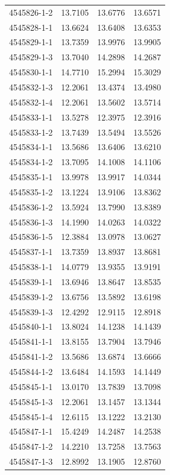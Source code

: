 \begin{longtable}{lrrr}
4545826-1-2 & 13.7105 & 13.6776 & 13.6571 \\
4545828-1-1 & 13.6624 & 13.6408 & 13.6353 \\
4545829-1-1 & 13.7359 & 13.9976 & 13.9905 \\
4545829-1-3 & 13.7040 & 14.2898 & 14.2687 \\
4545830-1-1 & 14.7710 & 15.2994 & 15.3029 \\
4545832-1-3 & 12.2061 & 13.4374 & 13.4980 \\
4545832-1-4 & 12.2061 & 13.5602 & 13.5714 \\
4545833-1-1 & 13.5278 & 12.3975 & 12.3916 \\
4545833-1-2 & 13.7439 & 13.5494 & 13.5526 \\
4545834-1-1 & 13.5686 & 13.6406 & 13.6210 \\
4545834-1-2 & 13.7095 & 14.1008 & 14.1106 \\
4545835-1-1 & 13.9978 & 13.9917 & 14.0344 \\
4545835-1-2 & 13.1224 & 13.9106 & 13.8362 \\
4545836-1-2 & 13.5924 & 13.7990 & 13.8389 \\
4545836-1-3 & 14.1990 & 14.0263 & 14.0322 \\
4545836-1-5 & 12.3884 & 13.0978 & 13.0627 \\
4545837-1-1 & 13.7359 & 13.8937 & 13.8681 \\
4545838-1-1 & 14.0779 & 13.9355 & 13.9191 \\
4545839-1-1 & 13.6946 & 13.8647 & 13.8535 \\
4545839-1-2 & 13.6756 & 13.5892 & 13.6198 \\
4545839-1-3 & 12.4292 & 12.9115 & 12.8918 \\
4545840-1-1 & 13.8024 & 14.1238 & 14.1439 \\
4545841-1-1 & 13.8155 & 13.7904 & 13.7946 \\
4545841-1-2 & 13.5686 & 13.6874 & 13.6666 \\
4545844-1-2 & 13.6484 & 14.1593 & 14.1449 \\
4545845-1-1 & 13.0170 & 13.7839 & 13.7098 \\
4545845-1-3 & 12.2061 & 13.1457 & 13.1344 \\
4545845-1-4 & 12.6115 & 13.1222 & 13.2130 \\
4545847-1-1 & 15.4249 & 14.2487 & 14.2538 \\
4545847-1-2 & 14.2210 & 13.7258 & 13.7563 \\
4545847-1-3 & 12.8992 & 13.1905 & 12.8760 \\

\end{longtable}
